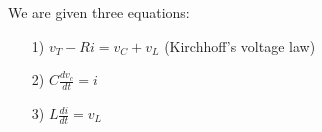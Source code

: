 \documentclass[preview]{standalone}
\begin{document}
\begin{center}
We are given three equations: 
                \begin{enumerate}
                    \item[1)] $v_T - Ri = v_C + v_L$ (Kirchhoff’s voltage law)
                    \item[2)] $C\frac{dv_c}{dt} = i$
                    \item[3)] $L\frac{di}{dt} = v_L$
                \end{enumerate}
\end{center}
\end{document}
